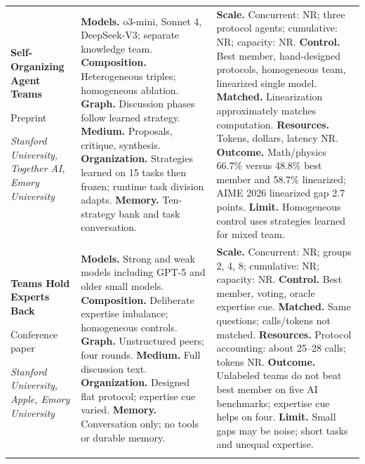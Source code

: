 \begin{longtable}{@{}>{\raggedright\arraybackslash}p{}>{\raggedright\arraybackslash}p{}>{\raggedright\arraybackslash}p{}@{}}
\textbf{Self-Organizing Agent Teams}\par \citep{sat-teams}\par Preprint\par\emph{Stanford University, Together AI, Emory University} & \textbf{Models.} o3-mini, Sonnet 4, DeepSeek-V3; separate knowledge team. \textbf{Composition.} Heterogeneous triples; homogeneous ablation. \textbf{Graph.} Discussion phases follow learned strategy. \textbf{Medium.} Proposals, critique, synthesis. \textbf{Organization.} Strategies learned on 15 tasks then frozen; runtime task division adapts. \textbf{Memory.} Ten-strategy bank and task conversation. & \textbf{Scale.} Concurrent: NR; three protocol agents; cumulative: NR; capacity: NR. \textbf{Control.} Best member, hand-designed protocols, homogeneous team, linearized single model. \textbf{Matched.} Linearization approximately matches computation. \textbf{Resources.} Tokens, dollars, latency NR. \textbf{Outcome.} Math/physics 66.7\% versus 48.8\% best member and 58.7\% linearized; AIME 2026 linearized gap 2.7 points. \textbf{Limit.} Homogeneous control uses strategies learned for mixed team. \\ \addlinespace[5pt]
\textbf{Teams Hold Experts Back}\par \citep{teams-hold-experts-back}\par Conference paper\par\emph{Stanford University, Apple, Emory University} & \textbf{Models.} Strong and weak models including GPT-5 and older small models. \textbf{Composition.} Deliberate expertise imbalance; homogeneous controls. \textbf{Graph.} Unstructured peers; four rounds. \textbf{Medium.} Full discussion text. \textbf{Organization.} Designed flat protocol; expertise cue varied. \textbf{Memory.} Conversation only; no tools or durable memory. & \textbf{Scale.} Concurrent: NR; groups 2, 4, 8; cumulative: NR; capacity: NR. \textbf{Control.} Best member, voting, oracle expertise cue. \textbf{Matched.} Same questions; calls/tokens not matched. \textbf{Resources.} Protocol accounting: about 25--28 calls; tokens NR. \textbf{Outcome.} Unlabeled teams do not beat best member on five AI benchmarks; expertise cue helps on four. \textbf{Limit.} Small gaps may be noise; short tasks and unequal expertise. \\ \addlinespace[5pt]

\end{longtable}
